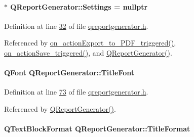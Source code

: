 \paragraph[{Settings}]{$\ast$ Q\+Report\+Generator\+::\+Settings = nullptr}\label{class_q_report_generator_a5e75a3f9447c0c24b32cd198a00af21c}


Definition at line \hyperlink{qreportgenerator_8h_source_l00032}{32} of file \hyperlink{qreportgenerator_8h_source}{qreportgenerator.\+h}.



Referenced by \hyperlink{qreportgenerator_8cpp_source_l00416}{on\+\_\+action\+Export\+\_\+to\+\_\+\+P\+D\+F\+\_\+triggered()}, \hyperlink{qreportgenerator_8cpp_source_l00401}{on\+\_\+action\+Save\+\_\+triggered()}, and \hyperlink{qreportgenerator_8cpp_source_l00004}{Q\+Report\+Generator()}.

\hypertarget{class_q_report_generator_a6ec92ac9d2ef36345c1f6089629c13a7}{}
\paragraph[{Title\+Font}]{\setlength{\rightskip}{0pt plus 5cm}Q\+Font Q\+Report\+Generator\+::\+Title\+Font\hspace{0.3cm}{\ttfamily [private]}}\label{class_q_report_generator_a6ec92ac9d2ef36345c1f6089629c13a7}


Definition at line \hyperlink{qreportgenerator_8h_source_l00073}{73} of file \hyperlink{qreportgenerator_8h_source}{qreportgenerator.\+h}.



Referenced by \hyperlink{qreportgenerator_8cpp_source_l00004}{Q\+Report\+Generator()}.

\hypertarget{class_q_report_generator_a1c6eac3b9c26e7fb32de033879ae6e6e}{}
\paragraph[{Title\+Format}]{\setlength{\rightskip}{0pt plus 5cm}Q\+Text\+Block\+Format Q\+Report\+Generator\+::\+Title\+Format\hspace{0.3cm}{\ttfamily [private]}}\label{class_q_report_generator_a1c6eac3b9c26e7fb32de033879ae6e6e}


